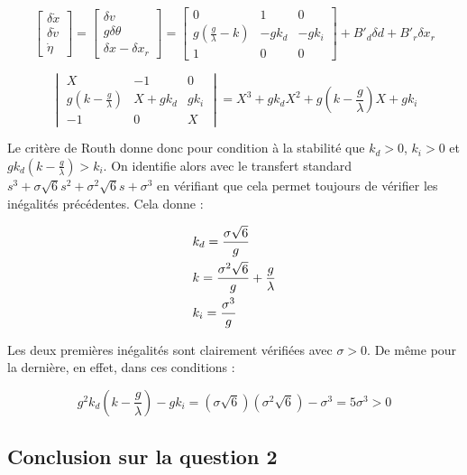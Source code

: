 \documentclass[10pt]{article}
\begin{document}
\[
	\begin{bmatrix}
		\delta \dot x \\
		\delta \dot v \\
		\dot \eta
	\end{bmatrix}
	= \begin{bmatrix}
		\delta v \\
		g \delta \theta \\
		\delta x - \delta x_r
	\end{bmatrix}
	= \begin{bmatrix}
		0 & 1 & 0 \\
		g ( \frac{g}{\lambda} - k ) & - g k_d & - g k_i \\
		1 & 0 & 0
	\end{bmatrix} +
	B'_d \delta d + B'_r \delta x_r
\]

\[
	\begin{vmatrix}
		X & - 1 & 0 \\
		g ( k - \frac{g}{\lambda} ) & X + g k_d & g k_i \\
		- 1 & 0 & X
	\end{vmatrix}
	= X^3 + g k_d X^2 + g ( k - \frac{g}{\lambda} ) X + g k_i
\]

\vspace{10px}

\noindent Le critère de Routh donne donc pour condition à la stabilité que $k_d > 0$, $k_i > 0$ et
$g k_d ( k - \frac{g}{\lambda} )  > k_i$. On identifie alors avec le transfert standard
$s^3 + \sigma \sqrt 6 s^2 + \sigma^2 \sqrt 6 s + \sigma^3$ en vérifiant que cela permet toujours de vérifier les
inégalités précédentes. Cela donne :

\begin{align}
	&k_d = \frac{\sigma \sqrt 6}{g} \notag \\
	&k = \frac{\sigma^2 \sqrt 6}{g} + \frac{g}{\lambda} \notag \\
	&k_i = \frac{\sigma^3}{g} \notag
\end{align}

\noindent Les deux premières inégalités sont clairement vérifiées avec $\sigma > 0$. De même pour la dernière,
en effet, dans ces conditions :

\[
	g^2 k_d ( k - \frac{g}{\lambda} )  - g k_i = ( \sigma \sqrt 6 ) ( \sigma^2 \sqrt 6 ) - \sigma^3 = 5 \sigma^3 > 0
\]

\subsection*{Conclusion sur la question 2}
\end{document}
